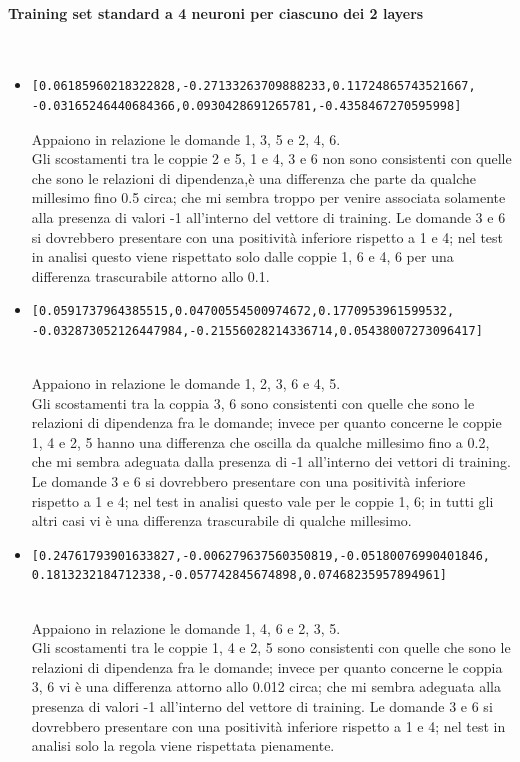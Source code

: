 \paragraph{Training set standard a 4 neuroni per ciascuno dei 2 layers}\mbox{}
\label{Training set standard a 4 neuroni per ciascuno dei 2 layers}
\\
\noindent
\begin{itemize}
\item \begin{verbatim}[0.06185960218322828,-0.27133263709888233,0.11724865743521667,
-0.03165246440684366,0.0930428691265781,-0.4358467270595998] \end{verbatim}
Appaiono in relazione le domande 1, 3, 5 e 2, 4, 6.\\
Gli scostamenti tra le coppie 2 e 5, 1 e 4, 3 e 6 non sono consistenti con quelle che sono le relazioni di dipendenza,\`e una differenza che parte da qualche millesimo fino 0.5 circa; che mi sembra troppo per venire associata solamente alla presenza di valori -1 all'interno del vettore di training.
Le domande 3 e 6 si dovrebbero presentare con una positivit\`a inferiore rispetto a 1 e 4; nel test in analisi questo viene rispettato solo dalle coppie 1, 6 e 4, 6  per una differenza trascurabile attorno allo 0.1.

\item \begin{verbatim}[0.0591737964385515,0.04700554500974672,0.1770953961599532,
-0.032873052126447984,-0.21556028214336714,0.05438007273096417]\end{verbatim}\\
Appaiono in relazione le domande 1, 2, 3, 6 e 4, 5.\\
Gli scostamenti tra la coppia 3, 6 sono consistenti con quelle che sono le relazioni di dipendenza fra le domande; invece per quanto concerne le coppie 1, 4 e 2, 5 hanno una differenza che oscilla da qualche millesimo fino a 0.2, che mi sembra adeguata dalla presenza di -1  all'interno dei vettori di training.
Le domande 3 e 6 si dovrebbero presentare con una positivit\`a inferiore rispetto a 1 e 4; nel test in analisi questo vale per le coppie 1, 6; in tutti gli altri casi vi \`e una differenza trascurabile di qualche millesimo.

\item \begin{verbatim}[0.24761793901633827,-0.006279637560350819,-0.05180076990401846,
0.1813232184712338,-0.057742845674898,0.07468235957894961]
\end{verbatim}\\
Appaiono in relazione le domande 1, 4, 6 e 2, 3, 5.\\
Gli scostamenti tra le  coppie 1, 4 e 2, 5 sono consistenti con quelle che sono le relazioni di dipendenza fra le domande; invece per quanto concerne le coppia 3, 6 vi \`e una differenza attorno allo 0.012 circa; che mi sembra adeguata alla presenza di valori -1 all'interno del vettore di training.
Le domande 3 e 6 si dovrebbero presentare con una positivit\`a inferiore rispetto a 1 e 4; nel test in analisi solo la regola viene rispettata pienamente.


\end{itemize}
